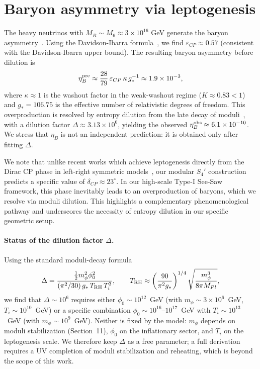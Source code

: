 \documentclass[12pt,a4paper]{article}
\numberwithin{equation}{section}
\begin{document}
\section{Baryon asymmetry via leptogenesis}
The heavy neutrinos with \(M_R \sim M_6 \approx 3 \times 10^{16}\) GeV generate the baryon asymmetry~\cite{Fukugita1986}. Using the Davidson-Ibarra formula~\cite{DavidsonIbarra2002}, we find \(\varepsilon_{CP} \approx 0.57\) (consistent with the Davidson-Ibarra upper bound). The resulting baryon asymmetry before dilution is
\begin{equation}
\eta_B^{\rm pre} \approx \frac{28}{79}\,\varepsilon_{CP}\,\kappa\,g_*^{-1} \approx 1.9\times10^{-3},
\end{equation}
where \(\kappa \approx 1\) is the washout factor in the weak-washout regime (\(K \approx 0.83 < 1\)) and \(g_* = 106.75\) is the effective number of relativistic degrees of freedom. This overproduction is resolved by entropy dilution from the late decay of moduli~\cite{KKLT2003}, with a dilution factor \(\Delta \approx 3.13 \times 10^6\), yielding the observed \(\eta_B^{\rm obs} \approx 6.1 \times 10^{-10}\). We stress that \(\eta_B\) is not an independent prediction: it is obtained only after fitting \(\Delta\).

We note that unlike recent works which achieve leptogenesis directly from the Dirac CP phase in left-right symmetric models~\cite{Chen2026}, our modular \(S_4'\) construction predicts a specific value of \(\delta_{CP} \approx 23^\circ\). In our high-scale Type-I See-Saw framework, this phase inevitably leads to an overproduction of baryons, which we resolve via moduli dilution. This highlights a complementary phenomenological pathway and underscores the necessity of entropy dilution in our specific geometric setup.
\paragraph{Status of the dilution factor \(\Delta\).}
Using the standard moduli-decay formula
\begin{equation}
\Delta = \frac{\tfrac12 m_\phi^2 \phi_0^2}
{(\pi^2/30)\,g_*\,T_{\rm RH}\,T_i^3},
\qquad
T_{\rm RH} \approx \left(\frac{90}{\pi^2 g_*}\right)^{1/4}
\sqrt{\frac{m_\phi^3}{8\pi M_{Pl}}},
\end{equation}
we find that \(\Delta \sim 10^6\) requires either \(\phi_0 \sim 10^{12}\)~GeV (with \(m_\phi \sim 3\times 10^6\)~GeV, \(T_i \sim 10^{10}\)~GeV) or a specific combination \(\phi_0 \sim 10^{16}\)--\(10^{17}\)~GeV with \(T_i \sim 10^{13}\)~GeV (with \(m_\phi \sim 10^9\)~GeV). Neither is fixed by the model: \(m_\phi\) depends on moduli stabilization (Section~11), \(\phi_0\) on the inflationary sector, and \(T_i\) on the leptogenesis scale. We therefore keep \(\Delta\) as a free parameter; a full derivation requires a UV completion of moduli stabilization and reheating, which is beyond the scope of this work.
\end{document}
